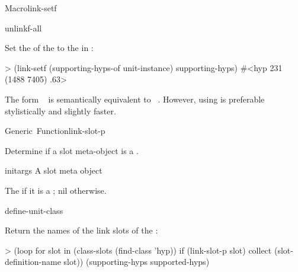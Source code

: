 \documentclass[10pt,twoside,english,pdftex]{article}
\begin{document}
\begin{functiondoc}{Macro}{link-setf}
\begin{alsos}{unlinkf-all}
\also[linkf]
\also[unlinkf]
\end{alsos}

\fnexample Set the   of the
  to the  in
:
\begin{example}
> (link-setf (supporting-hyps-of unit-instance) supporting-hyps)
#<hyp 231 (1488 7405) .63>
\end{example}

\fnnotes 
{}%
The form \mbox{ 
  } is semantically equivalent to
\mbox{
  \code{)}}.  However, using
\textbf{} is preferable stylistically and
slightly faster.

\end{functiondoc}


\begin{functiondoc}{Generic~Function}{link-slot-p}{
 \returns{} }

\fnsyntax

\fnpurpose Determine if a slot meta-object is a .

\fnmethods
{}

\fnpackage {}

\fnmodule {}

\fnargs
\begin{args}{initargs}
\arg[slot] A slot meta object
\end{args}

\fnreturns The  if it is a ; nil otherwise.

\begin{alsos}{define-unit-class}
\end{alsos}

\fnexample
Return the names of the link slots of the  :
\begin{example}
> (loop for slot in (class-slots (find-class 'hyp)) 
     if (link-slot-p slot) collect (slot-definition-name slot))
(supporting-hyps supported-hyps)
\end{example}

\end{functiondoc}
\end{document}
